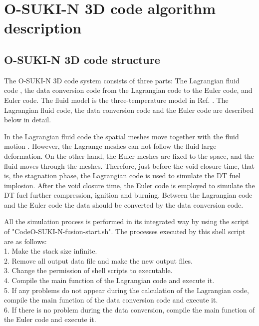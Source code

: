 %

\section{O-SUKI-N 3D code algorithm description}
\par

\subsection{O-SUKI-N 3D code structure}
     The O-SUKI-N 3D code system consists of three parts: The Lagrangian fluid code \cite{Schulz}, the data conversion code from the Lagrangian code to the Euler code, and Euler code. The fluid model is the three-temperature model in Ref. \cite{Tahir}. The Lagrangian fluid code, the data conversion code and the Euler code are described below in detail. 
     
     In the Lagrangian fluid code the spatial meshes move together with the fluid motion \cite{Schulz}. However, the Lagrange meshes can not follow the fluid large deformation. On the other hand, the Euler meshes are fixed to the space, and the fluid moves through the meshes. Therefore, just before the void closure time, that is, the stagnation phase, the Lagrangian code is used to simulate the DT fuel implosion. After the void closure time, the Euler code is employed to simulate the DT fuel further compression, ignition and burning. Between the Lagrangian code and the Euler code the data should be converted by the data conversion code. 

	All the simulation process is performed in its integrated way by using the script of "CodeO-SUKI-N-fusion-start.sh". The processes executed by this shell script are as follows: \\
1. Make the stack size infinite.\\
2. Remove all output data file and make the new output files.\\
3. Change the permission of shell scripts to executable. \\
4. Compile the main function of the Lagrangian code and execute it.\\
5. If any problems do not appear during the calculation of the Lagrangian code, compile the main function of the data conversion code and execute it.\\
6. If there is no problem during the data conversion, compile the main function of the Euler code and execute it.\\
     


